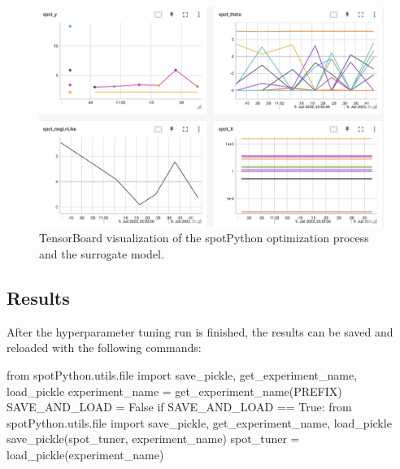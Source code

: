 \documentclass[
  letterpaper,
  DIV=11,
  numbers=noendperiod]{scrreprt}
\newenvironment{Shaded}{\begin{snugshade}}{\end{snugshade}}
\newcommand{\BuiltInTok}[1]{\textcolor[rgb]{0.00,0.23,0.31}{#1}}
\newcommand{\ControlFlowTok}[1]{\textcolor[rgb]{0.00,0.23,0.31}{#1}}
\newcommand{\ImportTok}[1]{\textcolor[rgb]{0.00,0.46,0.62}{#1}}
\newcommand{\NormalTok}[1]{\textcolor[rgb]{0.00,0.23,0.31}{#1}}
\newcommand{\OperatorTok}[1]{\textcolor[rgb]{0.37,0.37,0.37}{#1}}
\newcommand{\VariableTok}[1]{\textcolor[rgb]{0.07,0.07,0.07}{#1}}
\begin{document}
\begin{figure}[H]

{\centering \includegraphics[width=1\textwidth,height=\textheight]{figures_static/13_tensorboard_01.png}

}

\caption{TensorBoard visualization of the spotPython optimization
process and the surrogate model.}

\end{figure}%

\subsection{Results}\label{results-9}

After the hyperparameter tuning run is finished, the results can be
saved and reloaded with the following commands:

\begin{Shaded}
\begin{Highlighting}[]
\ImportTok{from}\NormalTok{ spotPython.utils.}\BuiltInTok{file} \ImportTok{import}\NormalTok{ save\_pickle, get\_experiment\_name,  load\_pickle}
\NormalTok{experiment\_name }\OperatorTok{=}\NormalTok{ get\_experiment\_name(PREFIX)}
\NormalTok{SAVE\_AND\_LOAD }\OperatorTok{=} \VariableTok{False}
\ControlFlowTok{if}\NormalTok{ SAVE\_AND\_LOAD }\OperatorTok{==} \VariableTok{True}\NormalTok{:}
    \ImportTok{from}\NormalTok{ spotPython.utils.}\BuiltInTok{file} \ImportTok{import}\NormalTok{ save\_pickle, get\_experiment\_name,  load\_pickle}
\NormalTok{    save\_pickle(spot\_tuner, experiment\_name)}
\NormalTok{    spot\_tuner }\OperatorTok{=}\NormalTok{ load\_pickle(experiment\_name)}
\end{Highlighting}
\end{Shaded}
\end{document}
